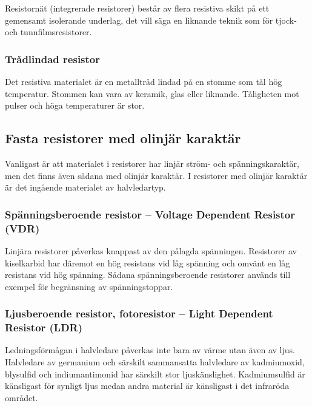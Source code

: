 Resistornät (integrerade resistorer) består av flera resistiva skikt på ett
gemensamt isolerande underlag, det vill säga en liknande teknik som för tjock- 
och tunnfilmsresistorer.

\subsubsection{Trådlindad resistor}

Det resistiva materialet är en metalltråd lindad på en stomme som tål
hög temperatur. Stommen kan vara av keramik, glas eller liknande.
Tåligheten mot pulser och höga temperaturer är stor.

\newpage %

\subsection{Fasta resistorer med olinjär karaktär}
\label{fasta_resistorer_olinjära}

Vanligast är att materialet i resistorer har linjär ström- och spänningskaraktär,
men det finns även sådana med olinjär karaktär. I resistorer med olinjär
karaktär är det ingående materialet av halvledartyp.

\subsubsection{Spänningsberoende resistor -- Voltage Dependent Resistor (VDR)}

Linjära resistorer påverkas knappast av den pålagda spänningen.
Resistorer av kiselkarbid har däremot en hög resistans vid låg spänning och
omvänt en låg resistans vid hög spänning.
Sådana spänningsberoende resistorer används till exempel för begränsning av
spänningstoppar.

\subsubsection{Ljusberoende resistor, fotoresistor -- Light Dependent Resistor (LDR)}

Ledningsförmågan i halvledare påverkas inte bara av värme utan även av ljus.
Halvledare av germanium och särskilt sammansatta halvledare av kadmiumoxid,
blysulfid och indiumantimonid har särskilt stor ljuskänslighet. Kadmiumsulfid
är känsligast för synligt ljus medan andra material är känsligast i det
infraröda området.

